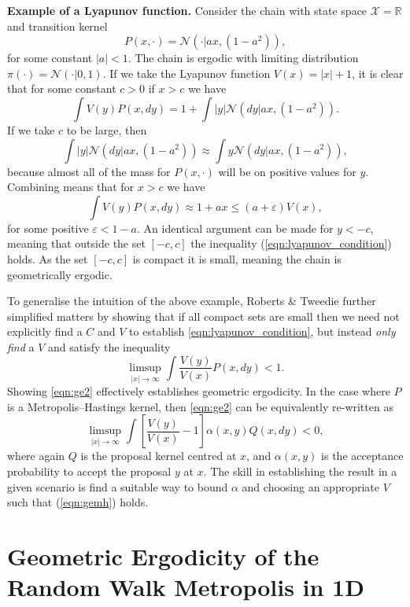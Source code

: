 \documentclass{article}
\newcommand{\X}{\mathcal{X}}
\begin{document}
\vspace{0.3cm}
{\color{darkblue}
\textbf{Example of a Lyapunov function.}  Consider the chain with state space $\X = \mathbb{R}$ and transition kernel
\[
P(x,\cdot) = \mathcal{N}(\cdot|ax, (1-a^2)),
\]
for some constant $|a|<1$.  The chain is ergodic with limiting distribution $\pi(\cdot) = \mathcal{N}(\cdot|0,1)$.  If we take the Lyapunov function $V(x) = |x| + 1$, it is clear that for some constant $c>0$ if $x > c$ we have
\[
\int V(y) P(x,dy) = 1 + \int |y| \mathcal{N}(dy|ax, (1-a^2)).
\]
If we take $c$ to be large, then
\[
\int |y| \mathcal{N}(dy|ax, (1-a^2)) \approx \int y \mathcal{N}(dy|ax, (1-a^2)),
\]
because almost all of the mass for $P(x,\cdot)$ will be on positive values for $y$.  Combining means that for $x > c$ we have
\[
\int V(y) P(x,dy) \approx 1 + ax \leq (a+\varepsilon)V(x),
\]
for some positive $\varepsilon < 1-a$.  An identical argument can be made for $y < -c$, meaning that outside the set $[-c,c]$ the inequality (\ref{eqn:lyapunov_condition}) holds.  As the set $[-c,c]$ is compact it is small, meaning the chain is geometrically ergodic.
}
\vspace{0.3cm}

To generalise the intuition of the above example, Roberts \& Tweedie \cite{roberts1996geometric} further simplified matters by showing that if all compact sets are small then we need not explicitly find a $C$ and $V$ to establish \eqref{eqn:lyapunov_condition}, but instead \emph{only find} a $V$ and satisfy the inequality
\begin{equation} \label{eqn:ge2}
\limsup_{|x| \to \infty} \int \frac{V(y)}{V(x)} P(x,dy) < 1.
\end{equation}
Showing \eqref{eqn:ge2} effectively  establishes geometric ergodicity.  In the case where $P$ is a Metropolis--Hastings kernel, then \eqref{eqn:ge2} can be equivalently re-written as
\begin{equation} \label{eqn:gemh}
\limsup_{|x| \to \infty} \int \left[ \frac{V(y)}{V(x)} - 1 \right] \alpha(x,y)Q(x,dy) < 0,
\end{equation}
where again $Q$ is the proposal kernel centred at $x$, and $\alpha(x,y)$ is the acceptance probability to accept the proposal $y$ at $x$.  The skill in establishing the result in a given scenario is find a suitable way to bound $\alpha$ and choosing an appropriate $V$ such that (\ref{eqn:gemh}) holds.

\section{Geometric Ergodicity of the Random Walk Metropolis in 1D}
\end{document}
